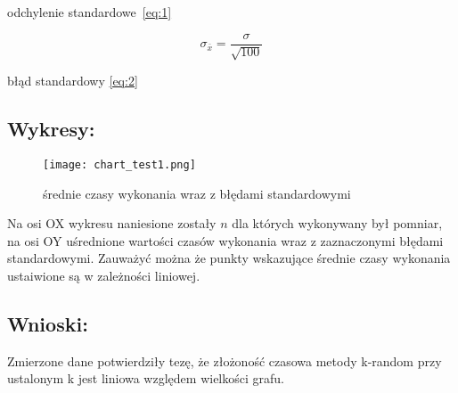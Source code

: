 odchylenie standardowe~\ref{eq:1}

\begin{equation} \label{eq:2}
  \sigma_{\bar{x}} = \frac{\sigma}{\sqrt{100}}
\end{equation}
  
błąd standardowy \ref{eq:2} 

\subsection{Wykresy: }
\begin{figure}[h]
    \centering
    \texttt{[image: chart\_test1.png]}
    \caption{średnie czasy wykonania wraz z błędami standardowymi}
\end{figure}
Na osi OX wykresu naniesione zostały \(n\) dla których wykonywany był pomniar, na osi OY uśrednione wartości czasów wykonania wraz z zaznaczonymi błędami standardowymi.
Zauważyć można że punkty wskazujące średnie czasy wykonania ustaiwione są w zależności liniowej.


\subsection{Wnioski: }
Zmierzone dane potwierdziły tezę, że złożoność czasowa metody k-random przy ustalonym k jest liniowa względem wielkości grafu. 

